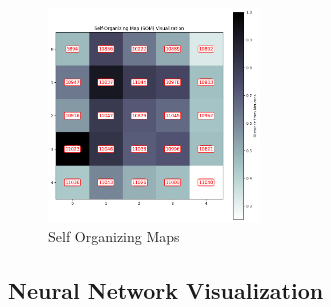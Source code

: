 \documentclass[a4paper,11pt]{article}
\begin{document}
\begin{figure}[h!]
    \centering
    \includegraphics[width=0.5\textwidth]{som.png}
    \caption{Self Organizing Maps}
    \label{fig:sm}
\end{figure}

\FloatBarrier

\subsection{Neural Network Visualization}
\end{document}
